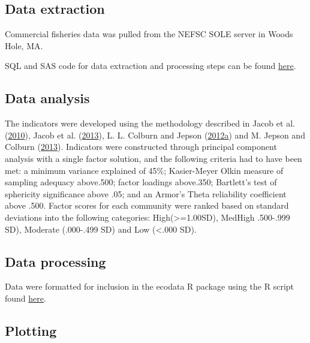 \documentclass[
]{book}
\begin{document}
\hypertarget{data-extraction-10}{%
\subsection{Data extraction}\label{data-extraction-10}}

Commercial fisheries data was pulled from the NEFSC SOLE server in Woods Hole, MA.

SQL and SAS code for data extraction and processing steps can be found \href{https://github.com/NOAA-EDAB/tech-doc/tree/master/R/stored_scripts/comm_rel_vuln_extraction.sql}{here}.

\hypertarget{data-analysis-10}{%
\subsection{Data analysis}\label{data-analysis-10}}

The indicators were developed using the methodology described in Jacob et al. (\protect\hyperlink{ref-Jacob2010}{2010}), Jacob et al. (\protect\hyperlink{ref-Jacob2013}{2013}), L. L. Colburn and Jepson (\protect\hyperlink{ref-colburn2012}{2012}\protect\hyperlink{ref-colburn2012}{a}) and M. Jepson and Colburn (\protect\hyperlink{ref-Jepson2013}{2013}). Indicators were constructed through principal component analysis with a single factor solution, and the following criteria had to have been met: a minimum variance explained of 45\%; Kasier-Meyer Olkin measure of sampling adequacy above.500; factor loadings above.350; Bartlett's test of sphericity significance above .05; and an Armor's Theta reliability coefficient above .500. Factor scores for each community were ranked based on standard deviations into the following categories: High(\textgreater=1.00SD), MedHigh .500-.999 SD), Moderate (.000-.499 SD) and Low (\textless.000 SD).

\hypertarget{data-processing-9}{%
\subsection{Data processing}\label{data-processing-9}}

Data were formatted for inclusion in the ecodata R package using the R script found \href{https://raw.githubusercontent.com/NOAA-EDAB/ecodata/master/data-raw/get_engagement.R}{here}.

\hypertarget{plotting-8}{%
\subsection{Plotting}\label{plotting-8}}
\end{document}

